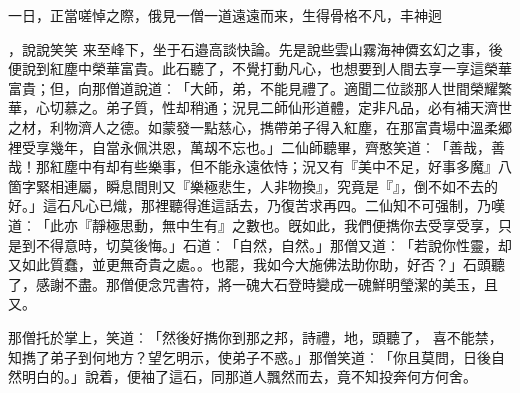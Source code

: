 一日，正當嗟悼之際，俄見一僧一道遠遠而来，生得骨格不凡，丰神迥{，說說笑笑%
来至峰下，坐于石邉高談快論。先是說些雲山霧海神僲玄幻之事，後便說到紅塵中榮華富貴。此石聽了，不覺打動凡心，也想要到人間去享一享這榮華富貴；但，向那僧道說道︰「大師，弟，不能見禮了。適聞二位談那人世間榮耀繁華，心切慕之。弟子質，性却稍通；況見二師仙形道體，定非凡品，必有補天濟世之材，利物濟人之德。如蒙發一點慈心，擕帶弟子得入紅塵，在那富貴場中溫柔郷裡受享幾年，自當永佩洪恩，萬刼不忘也。」二仙師聽畢，齊憨笑道︰「善哉，善哉！那紅塵中有却有些樂事，但不能永遠依恃；況又有『美中不足，好事多魔』八箇字緊相連屬，瞬息間則又『樂極悲生，人非物換』，究竟是『』，倒不如不去的好。」這石凡心已熾，那裡聽得進這話去，乃復苦求再四。二仙知不可强制，乃嘆道︰「此亦『靜極思動，無中生有』之數也。旣如此，我們便擕你去受享受享，只是到不得意時，切莫後悔。」石道︰「自然，自然。」那僧又道︰「若說你性靈，却又如此質蠢，並更無奇貴之處。。也罷，我如今大施佛法助你助，好否？」石頭聽了，感謝不盡。那僧便念咒書符，將一磈大石登時變成一磈鮮明瑩潔的美玉，且又。
\par%
那僧托於掌上，笑道︰「然後好擕你到那之邦，詩禮，地，頭聽了，%
喜不能禁，知擕了弟子到何地方？望乞明示，使弟子不惑。」那僧笑道︰「你且莫問，日後自然明白的。」說着，便袖了這石，同那道人飄然而去，竟不知投奔何方何舍。
}
